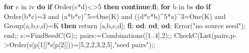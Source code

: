 \documentclass[
  10pt,
  letterpaper,
]{article}
\newenvironment{Shaded}{}{}
\newcommand{\BuiltInTok}[1]{\textcolor[rgb]{0.00,0.50,0.00}{#1}}
\newcommand{\ConstantTok}[1]{\textcolor[rgb]{0.53,0.00,0.00}{#1}}
\newcommand{\ControlFlowTok}[1]{\textcolor[rgb]{0.00,0.44,0.13}{\textbf{#1}}}
\newcommand{\ExtensionTok}[1]{#1}
\newcommand{\FloatTok}[1]{\textcolor[rgb]{0.25,0.63,0.44}{#1}}
\newcommand{\FunctionTok}[1]{\textcolor[rgb]{0.02,0.16,0.49}{#1}}
\newcommand{\NormalTok}[1]{#1}
\newcommand{\OperatorTok}[1]{\textcolor[rgb]{0.40,0.40,0.40}{#1}}
\newcommand{\StringTok}[1]{\textcolor[rgb]{0.25,0.44,0.63}{#1}}
\newcommand{\VariableTok}[1]{\textcolor[rgb]{0.10,0.09,0.49}{#1}}
\begin{document}
\begin{Shaded}
\begin{Highlighting}[]
  \ControlFlowTok{for} \VariableTok{c} \ExtensionTok{in} \VariableTok{iv} \ControlFlowTok{do}
   \ControlFlowTok{if} \BuiltInTok{Order}\NormalTok{(}\VariableTok{c}\OperatorTok{*}\VariableTok{d}\NormalTok{)}\OperatorTok{\textless{}\textgreater{}}\FloatTok{5} \ControlFlowTok{then} \ControlFlowTok{continue}\OperatorTok{;}\ControlFlowTok{fi}\OperatorTok{;}
   \ControlFlowTok{for} \VariableTok{b} \ExtensionTok{in} \VariableTok{bs} \ControlFlowTok{do}
    \ControlFlowTok{if} \BuiltInTok{Order}\NormalTok{(}\VariableTok{b}\OperatorTok{*}\VariableTok{c}\NormalTok{)}\OperatorTok{=}\FloatTok{3} \ConstantTok{and}\NormalTok{ (}\VariableTok{a}\OperatorTok{*}\VariableTok{b}\OperatorTok{*}\VariableTok{c}\NormalTok{)}\OperatorTok{\^{}}\FloatTok{5}\OperatorTok{=}\BuiltInTok{One}\NormalTok{(}\VariableTok{K}\NormalTok{)}
      \ConstantTok{and}\NormalTok{ ((}\VariableTok{d}\OperatorTok{*}\VariableTok{c}\OperatorTok{*}\VariableTok{b}\NormalTok{)}\OperatorTok{\^{}}\FloatTok{5}\OperatorTok{*}\VariableTok{a}\NormalTok{)}\OperatorTok{\^{}}\FloatTok{3}\OperatorTok{=}\BuiltInTok{One}\NormalTok{(}\VariableTok{K}\NormalTok{) }\ConstantTok{and} \BuiltInTok{Group}\NormalTok{(}\VariableTok{a}\OperatorTok{,}\VariableTok{b}\OperatorTok{,}\VariableTok{c}\OperatorTok{,}\VariableTok{d}\NormalTok{)}\OperatorTok{=}\VariableTok{K} \ControlFlowTok{then}
     \ExtensionTok{return}\NormalTok{ [}\VariableTok{a}\OperatorTok{,}\VariableTok{b}\OperatorTok{,}\VariableTok{c}\OperatorTok{,}\VariableTok{d}\NormalTok{]}\OperatorTok{;}
    \ControlFlowTok{fi}\OperatorTok{;}
   \ControlFlowTok{od}\OperatorTok{;}
  \ControlFlowTok{od}\OperatorTok{;}
 \ControlFlowTok{od}\OperatorTok{;}
 \BuiltInTok{Error}\NormalTok{(}\StringTok{"no source seed"}\NormalTok{)}\OperatorTok{;}
\FunctionTok{end}\OperatorTok{;;}
\VariableTok{s}\OperatorTok{:=}\VariableTok{FindSeedC}\NormalTok{(}\VariableTok{G}\NormalTok{)}\OperatorTok{;;}
\VariableTok{pairs}\OperatorTok{:=}\BuiltInTok{Combinations}\NormalTok{([}\FloatTok{1}\OperatorTok{..}\FloatTok{4}\NormalTok{]}\OperatorTok{,}\FloatTok{2}\NormalTok{)}\OperatorTok{;;}
\VariableTok{CheckC}\NormalTok{(}\BuiltInTok{List}\NormalTok{(}\VariableTok{pairs}\OperatorTok{,}\VariableTok{p}\OperatorTok{{-}\textgreater{}}\BuiltInTok{Order}\NormalTok{(}\VariableTok{s}\NormalTok{[}\VariableTok{p}\NormalTok{[}\FloatTok{1}\NormalTok{]]}\OperatorTok{*}\VariableTok{s}\NormalTok{[}\VariableTok{p}\NormalTok{[}\FloatTok{2}\NormalTok{]]))}\OperatorTok{=}\NormalTok{[}\FloatTok{5}\OperatorTok{,}\FloatTok{2}\OperatorTok{,}\FloatTok{2}\OperatorTok{,}\FloatTok{3}\OperatorTok{,}\FloatTok{2}\OperatorTok{,}\FloatTok{5}\NormalTok{]}\OperatorTok{,}\StringTok{"seed pairs"}\NormalTok{)}\OperatorTok{;;}

\end{Highlighting}
\end{Shaded}
\end{document}
